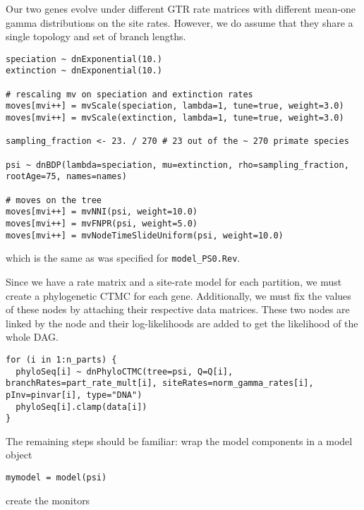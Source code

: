 Our two genes evolve under different GTR rate matrices with different mean-one gamma distributions on the site rates.
However, we do assume that they share a single topology and set of branch lengths.
{\tt \begin{snugshade*}
\begin{lstlisting}
speciation ~ dnExponential(10.)
extinction ~ dnExponential(10.)

# rescaling mv on speciation and extinction rates
moves[mvi++] = mvScale(speciation, lambda=1, tune=true, weight=3.0)
moves[mvi++] = mvScale(extinction, lambda=1, tune=true, weight=3.0)

sampling_fraction <- 23. / 270 # 23 out of the ~ 270 primate species

psi ~ dnBDP(lambda=speciation, mu=extinction, rho=sampling_fraction, rootAge=75, names=names)

# moves on the tree
moves[mvi++] = mvNNI(psi, weight=10.0)
moves[mvi++] = mvFNPR(psi, weight=5.0)
moves[mvi++] = mvNodeTimeSlideUniform(psi, weight=10.0)
\end{lstlisting}
\end{snugshade*}}

which is the same as was specified for {\tt model\_PS0.Rev}.

Since we have a rate matrix and a site-rate model for each partition, we must create a phylogenetic CTMC for each gene. 
Additionally, we must fix the values of these nodes by attaching their respective data matrices.
These two nodes are linked by the  node and their log-likelihoods are added to get the likelihood of the whole DAG.
{\tt \begin{snugshade*}
\begin{lstlisting}
for (i in 1:n_parts) {
  phyloSeq[i] ~ dnPhyloCTMC(tree=psi, Q=Q[i], branchRates=part_rate_mult[i], siteRates=norm_gamma_rates[i], pInv=pinvar[i], type="DNA")
  phyloSeq[i].clamp(data[i])
}

\end{lstlisting}
\end{snugshade*}}

The remaining steps should be familiar:
wrap the model components in a model object

{\tt \begin{snugshade*}
\begin{lstlisting}
mymodel = model(psi)
\end{lstlisting}
\end{snugshade*}}

create the monitors

